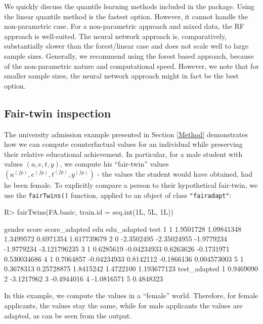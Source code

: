 \documentclass[
  notitle]{jss}
\begin{document}
We quickly discuss the quantile learning methods included in the
package. Using the linear quantile method is the fastest option.
However, it cannot handle the non-parametric case. For a non-parametric
approach and mixed data, the RF approach is well-suited. The neural
network approach is, comparatively, substantially slower than the
forest/linear case and does not scale well to large sample sizes.
Generally, we recommend using the forest based approach, because of the
non-parametric nature and computational speed. However, we note that for
smaller sample sizes, the neural network approach might in fact be the
best option.

\hypertarget{fair-twin-inspection}{%
\subsection{Fair-twin inspection}\label{fair-twin-inspection}}

The university admission example presented in Section \ref{Method}
demonstrates how we can compute counterfactual values for an individual
while preserving their relative educational achievement. In particular,
for a male student with values \((a, e, t, y)\), we compute his
``fair-twin'' values
\(( {a}^{(fp)},  {e}^{(fp)},  {t}^{(fp)},  {y}^{(fp)})\) - the values
the student would have obtained, had he been female. To explicitly
compare a person to their hypothetical fair-twin, we use the
\texttt{fairTwins()} function, applied to an object of class
\texttt{"fairadapt"}:

\begin{CodeChunk}
\begin{CodeInput}
R> fairTwins(FA.basic, train.id = seq.int(1L, 5L, 1L))
\end{CodeInput}
\begin{CodeOutput}
  gender      score score_adapted        edu edu_adapted         test
1      1  1.9501728    1.09841348  1.3499572   0.6971354  1.617739679
2      0 -2.3502495   -2.35024955 -1.9779234  -1.9779234 -3.121796235
3      1  0.6285619   -0.04234933  0.6263626  -0.1731971  0.530034686
4      1  0.7064857   -0.04234933  0.8142112  -0.1866136  0.004573003
5      1  0.3678313    0.25728875  1.8415242   1.4722100  1.193677123
  test_adapted
1    0.9469090
2   -3.1217962
3   -0.4944016
4   -1.0816571
5    0.4848323
\end{CodeOutput}
\end{CodeChunk}

In this example, we compute the values in a ``female'' world. Therefore,
for female applicants, the values stay the same, while for male
applicants the values are adapted, as can be seen from the output.
\end{document}
